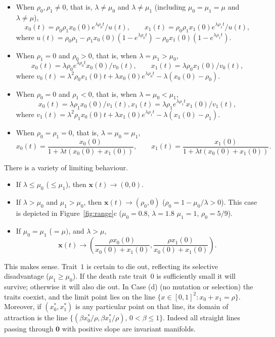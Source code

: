 \documentclass[12pt]{article}
\newcommand{\bzero}{\boldsymbol{0}}
\newcommand{\bx}{\boldsymbol{x}}
\begin{document}
\begin{itemize}
\item[(1)]
When $\rho_0,\rho_1\neq 0$, that is, $\lambda\neq \mu_0$ 
and $\lambda\neq \mu_1$ (including $\mu_0=\mu_1=\mu$ and $\lambda\neq
\mu$),
$$
x_0(t)= \rho_0 \rho_1 x_0(0)e^{\lambda \rho_0 t} /u(t),
\qquad
x_1(t)= \rho_0 \rho_1 x_1(0) e^{\lambda \rho_1 t}/u(t),
$$
where
$u(t)=\rho_0\rho_1 - \rho_1 x_0(0) (1-e^{\lambda \rho_0 t}) 
-\rho_0 x_1(0) (1-e^{\lambda \rho_1 t})$.

\item[(2)]
When $\rho_1=0$ and $\rho_0>0$, 
that is, when $\lambda=\mu_1>\mu_0$, 
$$
x_0(t) =
\lambda\rho_0 e^{\lambda\rho_0 t} x_0(0)/v_0(t),
\qquad
x_1(t) = \lambda\rho_0 x_1(0)/v_0(t),
$$
where
$v_0(t)=\lambda^2\rho_0 x_1(0) t + \lambda x_0(0) e^{\lambda\rho_0 t}
- \lambda(x_0(0)- \rho_0)$.

\item[(3)]
When $\rho_0=0$ and $\rho_1< 0$, 
that is, when $\lambda=\mu_0< \mu_1$,
$$ 
x_0(t) = \lambda\rho_1 x_0(0)/v_1(t),
x_1(t) = \lambda\rho_1 e^{\lambda\rho_1 t} x_1(0)/v_1(t),
$$
where
$v_1(t)=\lambda^2\rho_1 x_0(0) t + \lambda x_1(0) e^{\lambda\rho_1 t}
- \lambda(x_1(0)- \rho_1)$.

\item[(4)]
When $\rho_0=\rho_1=0$, that is, $\lambda=\mu_0=\mu_1$, 
$$
x_0(t) = \frac{x_0(0)}{1+\lambda t (x_0(0) + x_1(0))}, 
\qquad
x_1(t) = \frac{x_1(0)}{1+\lambda t (x_0(0) + x_1(0))}.
$$
\end{itemize}

\noindent
There is a variety of limiting behaviour.
\begin{itemize}
\item[(a)]
If $\lambda\leq \mu_0$ ($\leq \mu_1$), then $\bx(t)\to(0,0)$.
\item[(b)]
If $\lambda>\mu_0$ and $\mu_1>\mu_0$, then $\bx(t)\to (\rho_0,0)$
($\rho_0=1-\mu_0/\lambda >0$).
This case is depicted in Figure~\ref{fig:range}c
($\mu_0 = 0.8$, $\lambda = 1.8$ $\mu_1 = 1$, $\rho_0=5/9$).
\item[(d)]
If $\mu_0=\mu_1$ ($=\mu)$, and $\lambda>\mu$,
$$
\bx(t)\to 
\left(
\frac{\rho x_0(0)}{x_0(0)+ x_1(0)},
\frac{\rho x_1(0)}{x_0(0)+ x_1(0)}
\right).
$$
\end{itemize}
This makes sense. Trait~$1$ is certain to die out,
reflecting its selective disadvantage ($\mu_1 \ge \mu_0$).
If the death rate trait~$0$
is sufficiently small it will survive; otherwise it will also die out.
In Case (d) (no mutation or selection) the traits coexist, and
the limit point lies on the
line $\{x\in [0,1]^2: x_0+x_1=\rho\}$. Moreover, 
if $(x_0^*,x_1^*)$ is any particular point on that line, its domain
of attraction is the line
$\{(\beta x_0^*/\rho,\beta x_1^*/\rho),\, 0< \beta\leq 1\}$.
Indeed all straight lines passing through 
$\bzero$ with positive slope are invariant manifolds.
\end{document}
